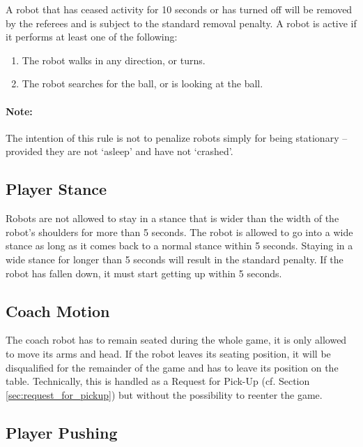 \documentclass[12pt]{article}
\newcommand{\cf}{\mbox{cf.}\xspace}
\begin{document}
A robot that has ceased activity for 10 seconds or has turned off will be removed by the referees and is subject to the standard removal penalty. A robot is active if it performs at least one of the following:

\begin{enumerate}

\item The robot walks in any direction, or turns.

\item The robot searches for the ball, or is looking at the ball.

\end{enumerate}

\paragraph{Note:} The intention of this rule is not to penalize robots simply for being stationary -- provided they are not `asleep' and have not `crashed'.

\subsection{Player Stance}
\label{sec:player_stance}

Robots are not allowed to stay in a stance that is wider than the width of the robot's shoulders for more than 5 seconds. The robot is allowed to go into a wide stance as long as it comes back to a normal stance within 5 seconds. Staying in a wide stance for longer than 5 seconds will result in the standard penalty. If the robot has fallen down, it must start getting up within 5 seconds. 

\subsection{Coach Motion}
\label{sec:coach_motion}

The coach robot has to remain seated during the whole game, it is only allowed to move its arms and head. If the robot leaves its seating position, it will be disqualified for the remainder of the game and has to leave its position on the table. Technically, this is handled as a Request for Pick-Up
(\cf Section \ref{sec:request_for_pickup}) but without the possibility to reenter the game.

\subsection{Player Pushing}
\label{sec:player_pushing}
\end{document}
